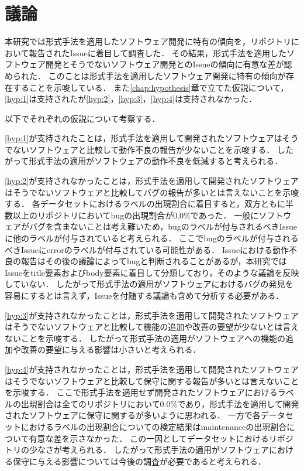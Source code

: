 \documentclass[main]{subfiles}
\begin{document}
\chapter{議論}

本研究では形式手法を適用したソフトウェア開発に特有の傾向を，リポジトリにおいて報告されたIssueに着目して調査した．
その結果，形式手法を適用したソフトウェア開発とそうでないソフトウェア開発とのIssueの傾向に有意な差が認められた．
このことは形式手法を適用したソフトウェア開発に特有の傾向が存在することを示唆している．
また\ref{chap:hypothesis}章で立てた仮説について，\ref{hyp:1}は支持されたが\ref{hyp:2}，\ref{hyp:3}，\ref{hyp:4}は支持されなかった．

以下でそれぞれの仮説について考察する．

\ref{hyp:1}が支持されたことは，形式手法を適用して開発されたソフトウェアはそうでないソフトウェアと比較して動作不良の報告が少ないことを示唆する．
したがって形式手法の適用がソフトウェアの動作不良を低減すると考えられる．

\ref{hyp:2}が支持されなかったことは，形式手法を適用して開発されたソフトウェアはそうでないソフトウェアと比較してバグの報告が多いとは言えないことを示唆する．
各データセットにおけるラベルの出現割合に着目すると，双方ともに半数以上のリポジトリにおいてbugの出現割合が0.0\%であった．
一般にソフトウェアがバグを含まないことは考え難いため，bugのラベルが付与されるべきIssueに他のラベルが付与されていると考えられる．
ここでbugのラベルが付与されるべきIssueにerrorのラベルが付与されている可能性がある．
Issueにおける動作不良の報告はその後の議論によってbugと判断されることがあるが，本研究ではIssueをtitle要素およびbody要素に着目して分類しており，そのような議論を反映していない．
したがって形式手法の適用がソフトウェアにおけるバグの発見を容易にするとは言えず，Issueを付随する議論も含めて分析する必要がある．

\ref{hyp:3}が支持されなかったことは，形式手法を適用して開発されたソフトウェアはそうでないソフトウェアと比較して機能の追加や改善の要望が少ないとは言えないことを示唆する．
したがって形式手法の適用がソフトウェアへの機能の追加や改善の要望に与える影響は小さいと考えられる．

\ref{hyp:4}が支持されなかったことは，形式手法を適用して開発されたソフトウェアはそうでないソフトウェアと比較して保守に関する報告が多いとは言えないことを示唆する．
ここで形式手法を適用せず開発されたソフトウェアにおけるラベルの出現割合は全てのリポジトリにおいて0.0\%であり，形式手法を適用して開発されたソフトウェアに保守に関するが多いように思われる．
一方で各データセットにおけるラベルの出現割合についての検定結果はmaintenanceの出現割合について有意な差を示さなかった．
この一因としてデータセットにおけるリポジトリの少なさが考えられる．
したがって形式手法の適用がソフトウェアにおける保守に与える影響については今後の調査が必要であると考えられる．
\end{document}

